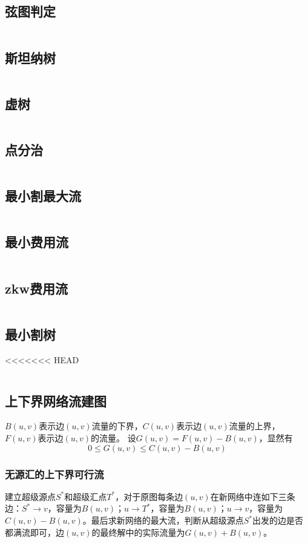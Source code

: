 \subsection{弦图判定}
\inputminted{cpp}{\source/graph-thery/judge.cpp}
\subsection{斯坦纳树}
\inputminted{cpp}{\source/graph-theory/Steiner-Tree.cpp}
\subsection{虚树}
\inputminted{cpp}{\source/graph-theory/mirage-tree.cpp}
\subsection{点分治}
\inputminted{cpp}{\source/graph-theory/vertex-partition.cpp}
\subsection{最小割最大流}
\inputminted{cpp}{\source/graph-theory/dinic.cpp}
\subsection{最小费用流}
\inputminted{cpp}{\source/graph-theory/mincost-maxflow.cpp}
\subsection{zkw费用流}
\inputminted{cpp}{\source/graph-theory/zkw-cost-flow.cpp}
\subsection{最小割树}
<<<<<<< HEAD
\inputminted{cpp}{\source/graph-theory/GH-tree.cpp}
\subsection{上下界网络流建图}
$B(u,v)$表示边$(u,v)$流量的下界，$C(u,v)$表示边$(u,v)$流量的上界，$F(u,v)$表示边$(u,v)$的流量。
设$G(u,v) = F(u,v) - B(u,v)$，显然有
$$0 \leq G(u,v) \leq C(u,v)-B(u,v)$$
\subsubsection{无源汇的上下界可行流}
建立超级源点$S^*$和超级汇点$T^*$，对于原图每条边$(u,v)$在新网络中连如下三条边：$S^* \rightarrow v$，容量为$B(u,v)$；$u \rightarrow T^*$，容量为$B(u,v)$；$u \rightarrow v$，容量为$C(u,v) - B(u,v)$。最后求新网络的最大流，判断从超级源点$S^*$出发的边是否都满流即可，边$(u,v)$的最终解中的实际流量为$G(u,v)+B(u,v)$。
